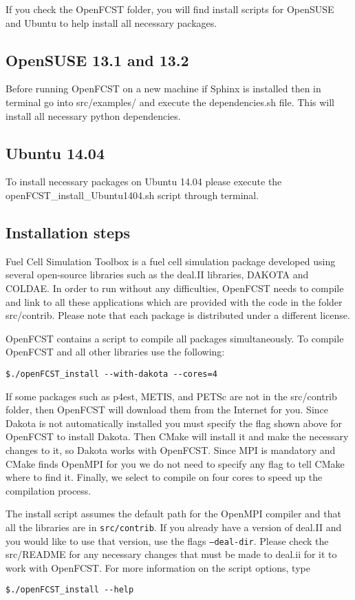 If you check the OpenFCST folder, you will find install scripts for OpenSUSE and Ubuntu
to help install all necessary packages.

\subsection{OpenSUSE 13.1 and 13.2}
Before running OpenFCST on a new machine if Sphinx is installed then in terminal go into src/examples/ and 
execute the dependencies.sh file. This will install all necessary python dependencies. 

\subsection{Ubuntu 14.04}
To install necessary packages on Ubuntu 14.04 please execute the openFCST\_install\_Ubuntu1404.sh script through terminal.

\subsection{Installation steps}
Fuel Cell Simulation Toolbox is a fuel cell simulation package developed using several open-source libraries 
such as the deal.II libraries, DAKOTA and COLDAE. In order to run 
without any difficulties, OpenFCST needs to compile and link to all these applications which are provided with 
the code in the folder src/contrib. Please note that each package is distributed under a different license. 

OpenFCST contains a script to compile all packages simultaneously. To compile OpenFCST and all other libraries use the following:
\begin{lstlisting}
$./openFCST_install --with-dakota --cores=4
\end{lstlisting}

If some packages such as p4est, METIS, and PETSc are not in the src/contrib folder, then OpenFCST will download them from the Internet for you.  Since Dakota is not automatically installed you must specify the flag shown above for OpenFCST to install Dakota. Then CMake will install it and make the necessary changes to it, so Dakota works with OpenFCST. Since MPI is mandatory and CMake finds OpenMPI for you we do not need to specify any flag to tell CMake where to find it.
Finally, we select to compile on four cores to speed up the compilation process. 

The install script assumes the default path for the OpenMPI compiler and that all the libraries are in \texttt{src/contrib}. If you already have a version of deal.II and you would like to use that version, use the flags \texttt{--deal-dir}. Please check the src/README for any necessary changes that must be made to deal.ii for it to work with OpenFCST. For more information on the script options, type
\begin{lstlisting}
$./openFCST_install --help
\end{lstlisting}


